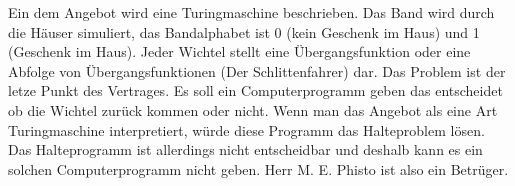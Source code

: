 \documentclass[a4]{exam}
\begin{document}
\begin{questions}
%
%
Ein dem Angebot wird eine Turingmaschine beschrieben. Das Band wird durch die Häuser simuliert, das Bandalphabet ist 0 (kein Geschenk im Haus) und 1 (Geschenk im Haus). Jeder Wichtel   stellt eine Übergangsfunktion oder eine Abfolge von Übergangsfunktionen (Der Schlittenfahrer) dar. Das Problem ist der letze Punkt des Vertrages. Es soll ein Computerprogramm geben das entscheidet ob die Wichtel zurück kommen oder nicht. Wenn man das Angebot als eine Art Turingmaschine interpretiert, würde diese Programm das Halteproblem lösen. Das Halteprogramm ist allerdings nicht entscheidbar und deshalb kann es ein solchen Computerprogramm nicht geben. Herr M. E. Phisto ist also ein Betrüger.

\end{questions}
\end{document}
